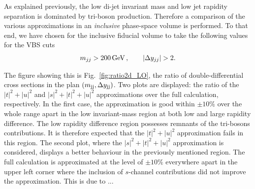As explained previously, the low di-jet invariant mass and low jet rapidity separation is dominated by tri-boson production.
Therefore a comparison of the various approximations in an \emph{inclusive} phase-space volume is performed.
To that end, we have chosen for the inclusive fiducial volume to take the following values for the VBS cuts
\begin{equation}
\label{eq:inclusive}
	m_{jj} > 200\,\text{GeV}\,,\qquad |\Delta y_{jj}| > 2 .
\end{equation}

The figure showing this is Fig.~\ref{fig:ratio2d_LO}, the ratio of double-differential cross sections in the plan $\left(m_{\text{j}\text{j}}, \Delta y_{\text{j}\text{j}}\right)$.
Two plots are displayed: the ratio of the $|t|^2 + |u|^2$ and $|s|^2 + |t|^2 + |u|^2$ approximations over the full calculation, respectively.
In the first case, the approximation is good within $\pm10\%$ over the whole range apart in the low invariant-mass region at both low and large rapidity difference.
The low rapidity difference region possesses remnants of the tri-bosons contributions.
It is therefore expected that the $|t|^2 + |u|^2$ approximation fails in this region.
The second plot, where the $|s|^2 + |t|^2 + |u|^2$ approximation is considered, displays a better behaviour in the previously mentioned region.
The full calculation is approximated at the level of $\pm10\%$ everywhere apart in the upper left corner where the inclusion of $s$-channel contributions did not improve the approximation.
This is due to ...

